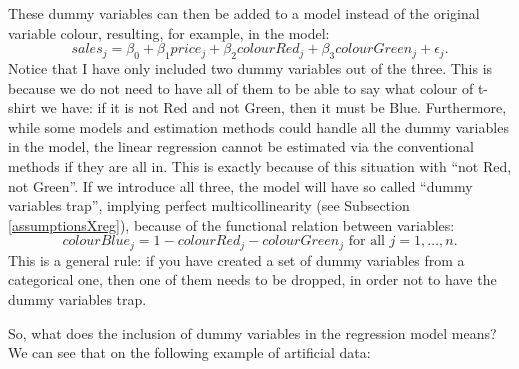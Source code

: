 \documentclass[
]{book}
\theoremstyle{definition}
\theoremstyle{definition}
\theoremstyle{definition}
\theoremstyle{definition}
\theoremstyle{remark}
\begin{document}
These dummy variables can then be added to a model instead of the original variable colour, resulting, for example, in the model:
\begin{equation}
    sales_j = \beta_0 + \beta_1 price_j + \beta_2 colourRed_j + \beta_3 colourGreen_j + \epsilon_j .
    \label{eq:regressionDummies01}
\end{equation}
Notice that I have only included two dummy variables out of the three. This is because we do not need to have all of them to be able to say what colour of t-shirt we have: if it is not Red and not Green, then it must be Blue. Furthermore, while some models and estimation methods could handle all the dummy variables in the model, the linear regression cannot be estimated via the conventional methods if they are all in. This is exactly because of this situation with ``not Red, not Green''. If we introduce all three, the model will have so called ``dummy variables trap'', implying perfect multicollinearity (see Subsection \ref{assumptionsXreg}), because of the functional relation between variables:
\begin{equation}
    colourBlue_j = 1 - colourRed_j - colourGreen_j \text{ for all } j=1, \dots, n .
    \label{eq:regressionDummies02}
\end{equation}
This is a general rule: if you have created a set of dummy variables from a categorical one, then one of them needs to be dropped, in order not to have the dummy variables trap.

So, what does the inclusion of dummy variables in the regression model means? We can see that on the following example of artificial data:
\end{document}
